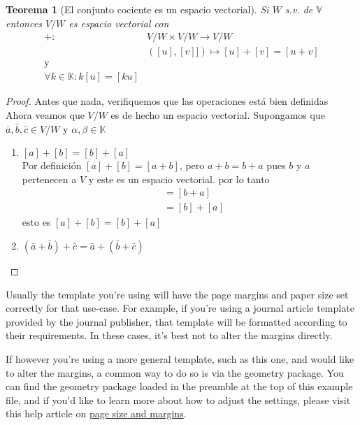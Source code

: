 \documentclass[14pt]{extarticle} %
\newtheorem{teorema}{Teorema}
\theoremstyle{problemastyle} %
\newcommand{\kampo}{\mathbb{K}}
\newcommand{\evV}{\mathbb{V}} %
\begin{document}
\begin{teorema}[El conjunto cociente es un espacio vectorial]
    Si $W$ s.v. de $\evV$ entonces $V/W$ es espacio vectorial con 
    \begin{align*}
        +:&V/W \times V/W \longrightarrow V/W\\
        &([u],[v]])\longmapsto [u]+[v] = [u+v]\\
        \text{y}\\
        \forall k \in \kampo : k[u]=[ku]
    \end{align*}
        
\end{teorema}
\begin{proof}
    Antes que nada, verifiquemos que las operaciones está bien definidas
    \\
    Ahora veamos que $V/W$ es de hecho un espacio vectorial.
    Supongamos que $\bar a,\bar b ,\bar c \in V/W $ y $\alpha,\beta \in \kampo$
    \begin{enumerate}
        \item $[a] + [b] = [ b] + [ a]$\\
            Por definición $[a] + [ b ]= [a+b]$, pero $a+b = b+a $ pues $b$ y $a$ pertenecen a $V$ y este es un espacio vectorial. por lo tanto  
            \begin{align*}
            [a+b] &= [b+a] \\
            &= [b] + [a] 
            \end{align*}
            esto es $[a]+[b]=[b]+[a]$
        \item $(\bar a + \bar b) + \bar c = \bar a + ( \bar b + \bar c)$\\
        
    \end{enumerate}
\end{proof}
Usually the template you're using will have the page margins and paper size set correctly for that use-case. For example, if you're using a journal article template provided by the journal publisher, that template will be formatted according to their requirements. In these cases, it's best not to alter the margins directly.

If however you're using a more general template, such as this one, and would like to alter the margins, a common way to do so is via the geometry package. You can find the geometry package loaded in the preamble at the top of this example file, and if you'd like to learn more about how to adjust the settings, please visit this help article on \href{https://www.overleaf.com/learn/latex/page_size_and_margins}{page size and margins}.
\end{document}
